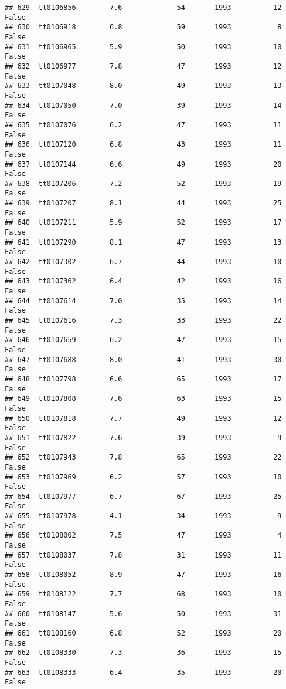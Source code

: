 \documentclass[
]{article}
\begin{document}
\begin{verbatim}
## 629  tt0106856        7.6             54       1993          12   False
## 630  tt0106918        6.8             59       1993           8   False
## 631  tt0106965        5.9             50       1993          10   False
## 632  tt0106977        7.8             47       1993          12   False
## 633  tt0107048        8.0             49       1993          13   False
## 634  tt0107050        7.0             39       1993          14   False
## 635  tt0107076        6.2             47       1993          11   False
## 636  tt0107120        6.8             43       1993          11   False
## 637  tt0107144        6.6             49       1993          20   False
## 638  tt0107206        7.2             52       1993          19   False
## 639  tt0107207        8.1             44       1993          25   False
## 640  tt0107211        5.9             52       1993          17   False
## 641  tt0107290        8.1             47       1993          13   False
## 642  tt0107302        6.7             44       1993          10   False
## 643  tt0107362        6.4             42       1993          16   False
## 644  tt0107614        7.0             35       1993          14   False
## 645  tt0107616        7.3             33       1993          22   False
## 646  tt0107659        6.2             47       1993          15   False
## 647  tt0107688        8.0             41       1993          30   False
## 648  tt0107798        6.6             65       1993          17   False
## 649  tt0107808        7.6             63       1993          15   False
## 650  tt0107818        7.7             49       1993          12   False
## 651  tt0107822        7.6             39       1993           9   False
## 652  tt0107943        7.8             65       1993          22   False
## 653  tt0107969        6.2             57       1993          10   False
## 654  tt0107977        6.7             67       1993          25   False
## 655  tt0107978        4.1             34       1993           9   False
## 656  tt0108002        7.5             47       1993           4   False
## 657  tt0108037        7.8             31       1993          11   False
## 658  tt0108052        8.9             47       1993          16   False
## 659  tt0108122        7.7             68       1993          10   False
## 660  tt0108147        5.6             50       1993          31   False
## 661  tt0108160        6.8             52       1993          20   False
## 662  tt0108330        7.3             36       1993          15   False
## 663  tt0108333        6.4             35       1993          20   False

\end{verbatim}
\end{document}
